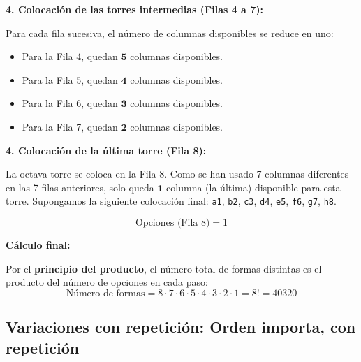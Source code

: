 \documentclass[a4paper,12pt]{article}
\begin{document}
\begin{ejercicio}[title=Ejercicio 47]

\textbf{4. Colocación de las torres intermedias (Filas 4 a 7):}

Para cada fila sucesiva, el número de columnas disponibles se reduce en uno:
\begin{itemize}
    \item Para la Fila 4, quedan $\mathbf{5}$ columnas disponibles.
    \item Para la Fila 5, quedan $\mathbf{4}$ columnas disponibles.
    \item Para la Fila 6, quedan $\mathbf{3}$ columnas disponibles.
    \item Para la Fila 7, quedan $\mathbf{2}$ columnas disponibles.
\end{itemize}

\textbf{4. Colocación de la última torre (Fila 8):}

La octava torre se coloca en la Fila 8. Como se han usado 7 columnas diferentes en las 7 filas anteriores, solo queda $\mathbf{1}$ columna (la última) disponible para esta torre.
Supongamos la siguiente colocación final: \verb|a1|, \verb|b2|, \verb|c3|, \verb|d4|, \verb|e5|, \verb|f6|, \verb|g7|, \verb|h8|.

\[
\text{Opciones (Fila 8)} = 1
\]
\begin{center}
    \chessboard[
        showmover=false,
        pgfstyle=color,
        opacity=0.25,
        color=green,
        markfields={h8}, %
        pgfstyle=color,
        opacity=0.25,
        color=red,
        markfields={a8,b8,c8,d8,e8,f8,g8}, %
        setpieces={ra1, rb2, rc3, rd4, re5, rf6, rg7, rh8} %
    ]
\end{center}
\vspace{0.5em}

\textbf{Cálculo final:}

Por el \textbf{principio del producto}, el número total de formas distintas es el producto del número de opciones en cada paso:
\[
\text{Número de formas} = 8 \cdot 7 \cdot 6 \cdot 5 \cdot 4 \cdot 3 \cdot 2 \cdot 1 = 8! = \boxed{40320}
\]

\end{ejercicio}

\subsection{Variaciones con repetición: Orden importa, con repetición}
\end{document}
